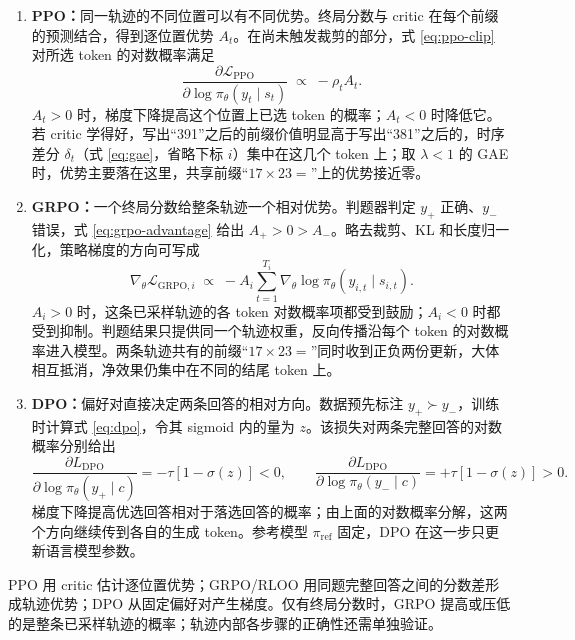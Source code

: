 \begin{enumerate}[leftmargin=*,itemsep=3mm]
  \item \textbf{PPO：}同一轨迹的不同位置可以有不同优势。终局分数与 critic 在每个前缀的预测结合，得到逐位置优势 \(A_t\)。在尚未触发裁剪的部分，式 \eqref{eq:ppo-clip} 对所选 token 的对数概率满足
  \begin{equation}
    \frac{\partial \mathcal L_{\mathrm{PPO}}}
      {\partial\log\pi_\theta(y_t\mid s_t)}
      \;\propto\;-\rho_t A_t.
  \end{equation}
  \(A_t>0\) 时，梯度下降提高这个位置上已选 token 的概率；\(A_t<0\) 时降低它。若 critic 学得好，写出“391”之后的前缀价值明显高于写出“381”之后的，时序差分 \(\delta_t\)（式 \eqref{eq:gae}，省略下标 \(i\)）集中在这几个 token 上；取 \(\lambda<1\) 的 GAE 时，优势主要落在这里，共享前缀“\(17\times23=\)”上的优势接近零。

  \item \textbf{GRPO：}一个终局分数给整条轨迹一个相对优势。判题器判定 \(y_+\) 正确、\(y_-\) 错误，式 \eqref{eq:grpo-advantage} 给出 \(A_+>0>A_-\)。略去裁剪、KL 和长度归一化，策略梯度的方向可写成
  \begin{equation}
    \nabla_\theta \mathcal L_{\mathrm{GRPO},i}
      \;\propto\;-A_i\sum_{t=1}^{T_i}
       \nabla_\theta\log\pi_\theta(y_{i,t}\mid s_{i,t}).
  \end{equation}
  \(A_i>0\) 时，这条已采样轨迹的各 token 对数概率项都受到鼓励；\(A_i<0\) 时都受到抑制。判题结果只提供同一个轨迹权重，反向传播沿每个 token 的对数概率进入模型。两条轨迹共有的前缀“\(17\times23=\)”同时收到正负两份更新，大体相互抵消，净效果仍集中在不同的结尾 token 上。

  \item \textbf{DPO：}偏好对直接决定两条回答的相对方向。数据预先标注 \(y_+\succ y_-\)，训练时计算式 \eqref{eq:dpo}，令其 sigmoid 内的量为 \(z\)。该损失对两条完整回答的对数概率分别给出
  \begin{equation}
    \frac{\partial L_{\mathrm{DPO}}}{\partial\log\pi_\theta(y_+\mid c)}
      =-\tau[1-\sigma(z)]<0,\qquad
    \frac{\partial L_{\mathrm{DPO}}}{\partial\log\pi_\theta(y_-\mid c)}
      =+\tau[1-\sigma(z)]>0.
  \end{equation}
  梯度下降提高优选回答相对于落选回答的概率；由上面的对数概率分解，这两个方向继续传到各自的生成 token。参考模型 \(\pi_{\mathrm{ref}}\) 固定，DPO 在这一步只更新语言模型参数。
\end{enumerate}

PPO 用 critic 估计逐位置优势；GRPO/RLOO 用同题完整回答之间的分数差形成轨迹优势；DPO 从固定偏好对产生梯度。仅有终局分数时，GRPO 提高或压低的是整条已采样轨迹的概率；轨迹内部各步骤的正确性还需单独验证。

